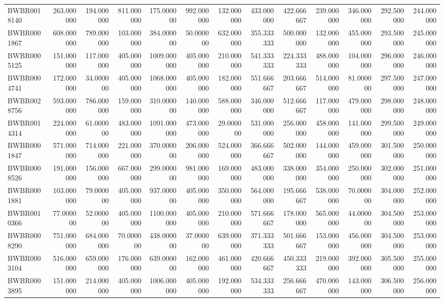\begin{longtable}{lrrrrrrrrrrrr}
BWBR0018140 & 263.000000 & 194.000000 & 811.000000 & 175.000000 & 992.000000 & 132.000000 & 433.000000 & 422.666667 & 239.000000 & 346.000000 & 292.500000 & 244.000000 \\
BWBR0001867 & 608.000000 & 789.000000 & 103.000000 & 384.000000 & 50.000000 & 632.000000 & 355.333333 & 500.000000 & 132.000000 & 455.000000 & 293.500000 & 245.000000 \\
BWBR0005125 & 151.000000 & 117.000000 & 405.000000 & 1009.000000 & 405.000000 & 210.000000 & 541.333333 & 224.333333 & 488.000000 & 104.000000 & 296.000000 & 246.000000 \\
BWBR0004741 & 172.000000 & 34.000000 & 405.000000 & 1068.000000 & 405.000000 & 182.000000 & 551.666667 & 203.666667 & 514.000000 & 81.000000 & 297.500000 & 247.000000 \\
BWBR0028756 & 593.000000 & 786.000000 & 159.000000 & 310.000000 & 140.000000 & 588.000000 & 346.000000 & 512.666667 & 117.000000 & 479.000000 & 298.000000 & 248.000000 \\
BWBR0014314 & 224.000000 & 61.000000 & 483.000000 & 1091.000000 & 473.000000 & 29.000000 & 531.000000 & 256.000000 & 458.000000 & 141.000000 & 299.500000 & 249.000000 \\
BWBR0001847 & 571.000000 & 714.000000 & 221.000000 & 370.000000 & 206.000000 & 524.000000 & 366.666667 & 502.000000 & 144.000000 & 459.000000 & 301.500000 & 250.000000 \\
BWBR0008526 & 191.000000 & 156.000000 & 667.000000 & 299.000000 & 981.000000 & 169.000000 & 483.000000 & 338.000000 & 354.000000 & 250.000000 & 302.000000 & 251.000000 \\
BWBR0001881 & 103.000000 & 79.000000 & 405.000000 & 937.000000 & 405.000000 & 350.000000 & 564.000000 & 195.666667 & 538.000000 & 70.000000 & 304.000000 & 252.000000 \\
BWBR0010366 & 77.000000 & 52.000000 & 405.000000 & 1100.000000 & 405.000000 & 210.000000 & 571.666667 & 178.000000 & 565.000000 & 44.000000 & 304.500000 & 253.000000 \\
BWBR0008290 & 751.000000 & 684.000000 & 70.000000 & 438.000000 & 37.000000 & 639.000000 & 371.333333 & 501.666667 & 153.000000 & 456.000000 & 304.500000 & 253.000000 \\
BWBR0003104 & 516.000000 & 659.000000 & 176.000000 & 639.000000 & 162.000000 & 461.000000 & 420.666667 & 450.333333 & 219.000000 & 392.000000 & 305.500000 & 255.000000 \\
BWBR0003895 & 151.000000 & 214.000000 & 405.000000 & 1006.000000 & 405.000000 & 192.000000 & 534.333333 & 256.666667 & 470.000000 & 143.000000 & 306.500000 & 256.000000 \\

\end{longtable}
